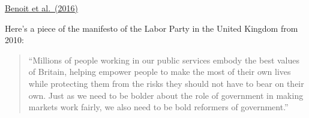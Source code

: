 \documentclass[aspectratio=169]{beamer}
\begin{document}
\begin{frame}

\begin{center}
\end{center}

\vfill
\href{http://dx.doi.org/10.1017/S0003055416000058}{Benoit et al.\ (2016)}

\end{frame}
\begin{frame}

Here's a piece of the manifesto of the Labor Party in the United Kingdom from 2010:

\begin{quote}
``Millions of people working in our public services embody the best values of Britain, helping empower people to make the most of their own lives while protecting them from the risks they should not have to bear on their own. Just as we need to be bolder about the role of government in making markets work fairly, we also need to be bold reformers of government.''
\end{quote}

\end{frame}
\end{document}
